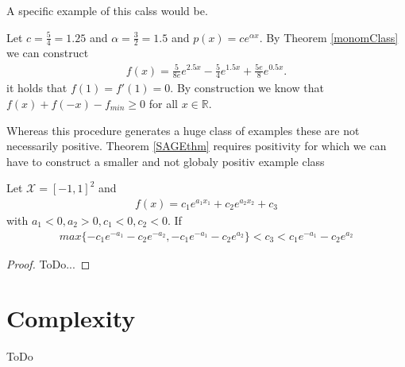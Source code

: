 \documentclass[./main.tex]{subfiles}
\begin{document}
A specific example of this calss would be.
\begin{bsp}
Let $c=\frac 5 4 =1.25$ and $\alpha = \frac 3 2 = 1.5$ and $p(x)=ce^{\alpha x}$. By Theorem \ref{monomClass} we can construct
\begin{align*}
f(x)= \frac{5}{8e}e^{2.5x} -\frac 5 4 e^{1.5x}+\frac{5e}{8}e^{0.5x}.
\end{align*}
it holds that $f(1)=f'(1)=0$. By construction we know that $f(x)+f(-x)-f_{min}\geq 0$ for all $x \in \mathbb{R}$.
\end{bsp}
Whereas this procedure generates a huge class of examples these are not necessarily positive. Theorem \ref{SAGEthm} requires positivity for which we can have to construct a smaller and not globaly positiv example class
\begin{thm}
Let $\mathcal{X}=[-1,1]^2$ and
\begin{align*}
f(x) = c_1e^{a_1x_1} + c_2e^{a_2x_2} + c_3 
\end{align*}
with $a_1<0, a_2>0, c_1<0, c_2<0$. If 
\begin{align*}
max \lbrace -c_1e^{-a_1} -c_2e^{-a_2},-c_1e^{-a_1} -c_2e^{a_2} \rbrace < c_3 < c_1e^{-a_1}-c_2e^{a_2}
\end{align*}
\end{thm}
\begin{proof}
ToDo...
\end{proof}



\section{Complexity}
ToDo
\end{document}
